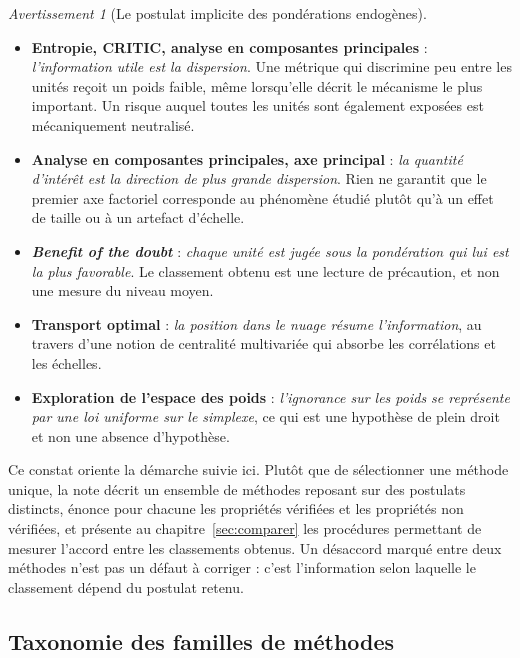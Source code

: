 \documentclass[11pt,a4paper]{article}
\theoremstyle{definition}
\theoremstyle{remark}
\newtheorem{avertissement}{Avertissement}[section]
\begin{document}
\begin{avertissement}[Le postulat implicite des pondérations endogènes]
  \label{av:cout}
  \begin{itemize}[nosep,leftmargin=1.4em]
    \item \textbf{Entropie, CRITIC, analyse en composantes principales} :
    \emph{l'information utile est la dispersion}. Une métrique qui discrimine peu entre
    les unités reçoit un poids faible, même lorsqu'elle décrit le mécanisme le plus
    important. Un risque auquel toutes les unités sont également exposées est
    mécaniquement neutralisé.
    \item \textbf{Analyse en composantes principales, axe principal} : \emph{la quantité
    d'intérêt est la direction de plus grande dispersion}. Rien ne garantit que le premier
    axe factoriel corresponde au phénomène étudié plutôt qu'à un effet de taille ou à un
    artefact d'échelle.
    \item \textbf{\emph{Benefit of the doubt}} : \emph{chaque unité est jugée sous la
    pondération qui lui est la plus favorable}. Le classement obtenu est une lecture de
    précaution, et non une mesure du niveau moyen.
    \item \textbf{Transport optimal} : \emph{la position dans le nuage résume
    l'information}, au travers d'une notion de centralité multivariée qui absorbe les
    corrélations et les échelles.
    \item \textbf{Exploration de l'espace des poids} : \emph{l'ignorance sur les poids se
    représente par une loi uniforme sur le simplexe}, ce qui est une hypothèse de plein
    droit et non une absence d'hypothèse.
  \end{itemize}
\end{avertissement}

\bigskip

Ce constat oriente la démarche suivie ici. Plutôt que de sélectionner une méthode unique,
la note décrit un ensemble de méthodes reposant sur des postulats distincts, énonce pour
chacune les propriétés vérifiées et les propriétés non vérifiées, et présente au
chapitre~\ref{sec:comparer} les procédures permettant de mesurer l'accord entre les
classements obtenus. Un désaccord marqué entre deux méthodes n'est pas un défaut à
corriger : c'est l'information selon laquelle le classement dépend du postulat retenu.

\bigskip

\subsection{Taxonomie des familles de méthodes}
\end{document}
